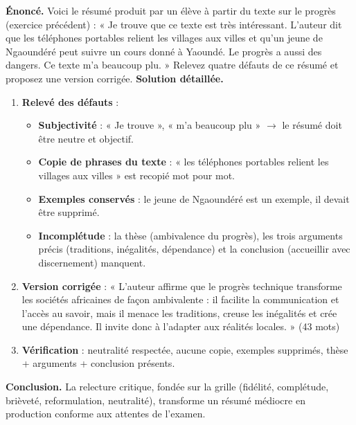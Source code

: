\documentclass[11pt]{article}
\begin{document}
\begin{exoresolu}
\textbf{Énoncé.} Voici le résumé produit par un élève à partir du texte sur le progrès (exercice précédent) : « Je trouve que ce texte est très intéressant. L'auteur dit que les téléphones portables relient les villages aux villes et qu'un jeune de Ngaoundéré peut suivre un cours donné à Yaoundé. Le progrès a aussi des dangers. Ce texte m'a beaucoup plu. » Relevez quatre défauts de ce résumé et proposez une version corrigée.
\tcblower
\textbf{Solution détaillée.}
\begin{enumerate}
\item \textbf{Relevé des défauts} :
\begin{itemize}
\item \textbf{Subjectivité} : « Je trouve », « m'a beaucoup plu » $\rightarrow$ le résumé doit être neutre et objectif.
\item \textbf{Copie de phrases du texte} : « les téléphones portables relient les villages aux villes » est recopié mot pour mot.
\item \textbf{Exemples conservés} : le jeune de Ngaoundéré est un exemple, il devait être supprimé.
\item \textbf{Incomplétude} : la thèse (ambivalence du progrès), les trois arguments précis (traditions, inégalités, dépendance) et la conclusion (accueillir avec discernement) manquent.
\end{itemize}
\item \textbf{Version corrigée} : « L'auteur affirme que le progrès technique transforme les sociétés africaines de façon ambivalente : il facilite la communication et l'accès au savoir, mais il menace les traditions, creuse les inégalités et crée une dépendance. Il invite donc à l'adapter aux réalités locales. » (43 mots)
\item \textbf{Vérification} : neutralité respectée, aucune copie, exemples supprimés, thèse + arguments + conclusion présents.
\end{enumerate}
\textbf{Conclusion.} La relecture critique, fondée sur la grille (fidélité, complétude, brièveté, reformulation, neutralité), transforme un résumé médiocre en production conforme aux attentes de l'examen.
\end{exoresolu}
\end{document}

